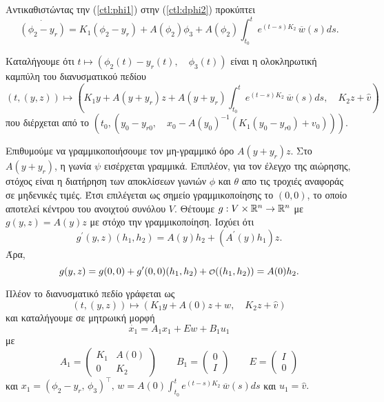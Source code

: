 Αντικαθιστώντας την (\ref{ctl:phi1}) στην (\ref{ctl:dphi2}) προκύπτει
\begin{equation}
    \dot{(\phi_2 - y_r)} = K_1 (\phi_2 - y_r) + A(\phi_2) \phi_3 + 
    A(\phi_2)\int_{t_0}^{t}{e^{(t-s)K_2}\,\overline{w}(s)} ds.    
\end{equation}

Καταλήγουμε ότι $t \mapsto (\phi_2(t) - y_r(t),\quad \phi_3(t))$ είναι η 
ολοκληρωτική καμπύλη του διανυσματικού πεδίου
\begin{equation*}
    \left(t, (y,z)\right) \mapsto \left(K_1y + A(y + y_r)z + A(y + y_r)
    \int_{t_0}^{t}{e^{(t-s)K_2}\,\overline{w}(s)} ds,\quad K_2z + 
    \widehat{v}\right)
\end{equation*}
που διέρχεται από το $\left(t_0,\left(y_0 - y_{r0},\quad x_0 - A(y_0)^{-1}\left(
K_1(y_0 - y_{r0}) + v_0\right)\right)\right)$.

Επιθυμούμε να γραμμικοποιήσουμε τον μη-γραμμικό όρο $A(y + y_r)z$. Στο 
$A(y + y_r)$, η γωνία $\psi$ εισέρχεται γραμμικά. Επιπλέον, για τον έλεγχο της 
αιώρησης, στόχος είναι η διατήρηση των αποκλίσεων γωνιών $\phi$ και $\theta$ 
απο τις τροχιές αναφοράς σε μηδενικές τιμές. Έτσι επιλέγεται ως σημείο 
γραμμικοποίησης το $(0, 0)$, το οποίο αποτελεί κέντρου του ανοιχτού συνόλου $V$. 
Θέτουμε $g:V \times \mathbb{R}^{n} \rightarrow \mathbb{R}^{n}$ με $g(y, z) = A(y)z$ με στόχο την 
γραμμικοποίηση. Ισχύει ότι
\begin{equation*}
    g^{\prime}(y, z)(h_1, h_2) = A(y) h_2 + (A^{\prime}(y)h_1)z.
\end{equation*}
Άρα,
\begin{equation*}
    g(y, z) = g(0, 0) + g^{\prime}(0, 0)(h_1, h_2) + {\scriptstyle \mathcal{O}}((h_1, h_2)) = 
    A(0)h_2.
\end{equation*}

Πλέον το διανυσματικό πεδίο γράφεται ως
\begin{equation*} 
    \left(t, (y,z)\right) \mapsto \left(K_1y + A(0)z + w,\quad K_2z + 
    \widehat{v}\right)
\end{equation*}
και καταλήγουμε σε μητρωική μορφή
\begin{equation}
    \dot{x_1} = A_1 x_1 + Ew + B_1 u_1
    \label{ctl:linsys}
\end{equation}
με 
\begin{equation*}
    A_1 =
    \begin{pmatrix}
        K_1 & A(0) \\
        0 & K_2
    \end{pmatrix} \qquad
    B_1 = 
    \begin{pmatrix}
        0 \\
        I
    \end{pmatrix} \qquad
    E = 
    \begin{pmatrix}
        I \\
        0
    \end{pmatrix}
\end{equation*}
και $x_1 = \left(\phi_2 - y_r, \, \phi_3\right)^{\intercal}, \, w = 
A(0)\int_{t_0}^{t}{e^{(t-s)K_2}\,\overline{w}(s)} ds$ και $u_1 = \widehat{v}.$

